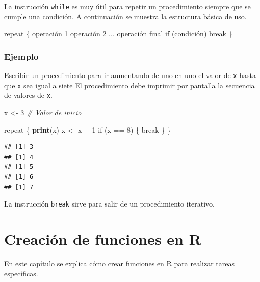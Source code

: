 \documentclass[10pt,]{krantz}
\makeatletter
\newenvironment{Shaded}{\begin{snugshade}}{\end{snugshade}}
\newcommand{\KeywordTok}[1]{\textcolor[rgb]{0.13,0.29,0.53}{\textbf{{#1}}}}
\newcommand{\DecValTok}[1]{\textcolor[rgb]{0.00,0.00,0.81}{{#1}}}
\newcommand{\StringTok}[1]{\textcolor[rgb]{0.31,0.60,0.02}{{#1}}}
\newcommand{\CommentTok}[1]{\textcolor[rgb]{0.56,0.35,0.01}{\textit{{#1}}}}
\newcommand{\NormalTok}[1]{{#1}}
\let\proglang=\textsf
\newenvironment{kframe}{%
\medskip{}
\setlength{\fboxsep}{.8em}
 \def\at@end@of@kframe{}%
 \ifinner\ifhmode%
  \def\at@end@of@kframe{\end{minipage}}%
  \begin{minipage}{\columnwidth}%
 \fi\fi%
 \def\FrameCommand##1{\hskip\@totalleftmargin \hskip-\fboxsep
 \colorbox{shadecolor}{##1}\hskip-\fboxsep
     \hskip-\linewidth \hskip-\@totalleftmargin \hskip\columnwidth}%
 \MakeFramed {\advance\hsize-\width
   \@totalleftmargin\z@ \linewidth\hsize
   \@setminipage}}%
 {\par\unskip\endMakeFramed%
 \at@end@of@kframe}
\renewenvironment{Shaded}{\begin{kframe}}{\end{kframe}}
\let\BeginKnitrBlock\begin \let\EndKnitrBlock\end
\makeatother
\begin{document}
La instrucción \texttt{while} es muy útil para repetir un procedimiento
siempre que se cumple una condición. A continuación se muestra la
estructura básica de uso.

\begin{Shaded}
\begin{Highlighting}[]
\NormalTok{repeat \{}
  \NormalTok{operación }\DecValTok{1}
  \NormalTok{operación }\DecValTok{2}
  \NormalTok{...}
  \NormalTok{operación final}
  \NormalTok{if (condición) break}
\NormalTok{\}}
\end{Highlighting}
\end{Shaded}

\subsection*{Ejemplo}\label{ejemplo-19}


Escribir un procedimiento para ir aumentando de uno en uno el valor de
\texttt{x} hasta que \texttt{x} sea igual a siete El procedimiento debe
imprimir por pantalla la secuencia de valores de \texttt{x}.

\begin{Shaded}
\begin{Highlighting}[]
\NormalTok{x <-}\StringTok{ }\DecValTok{3}  \CommentTok{# Valor de inicio}

\NormalTok{repeat \{}
   \KeywordTok{print}\NormalTok{(x)}
   \NormalTok{x <-}\StringTok{  }\NormalTok{x +}\StringTok{ }\DecValTok{1}
   \NormalTok{if (x ==}\StringTok{ }\DecValTok{8}\NormalTok{) \{}
     \NormalTok{break}
   \NormalTok{\}}
\NormalTok{\}}
\end{Highlighting}
\end{Shaded}

\begin{verbatim}
## [1] 3
## [1] 4
## [1] 5
## [1] 6
## [1] 7
\end{verbatim}

\BeginKnitrBlock{rmdtip}
La instrucción \texttt{break} sirve para salir de un procedimiento
iterativo.
\EndKnitrBlock{rmdtip}

\chapter{\texorpdfstring{Creación de funciones en \proglang{R}
\label{creafun}}{Creación de funciones en  }}\label{creacion-de-funciones-en}

En este capítulo se explica cómo crear funciones en \proglang{R} para
realizar tareas específicas.
\end{document}
